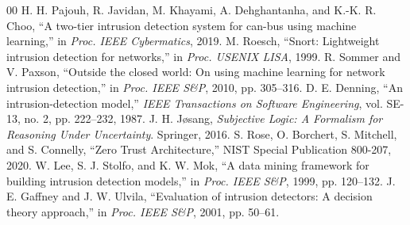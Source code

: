 \documentclass[journal,10pt,onecolumn]{IEEEtran}
\begin{document}
\begin{thebibliography}{00}
 H. H. Pajouh, R. Javidan, M. Khayami, A. Dehghantanha, and K.-K. R. Choo, ``A two-tier intrusion detection system for can-bus using machine learning,'' in \textit{Proc. IEEE Cybermatics}, 2019.
 M. Roesch, ``Snort: Lightweight intrusion detection for networks,'' in \textit{Proc. USENIX LISA}, 1999.
 R. Sommer and V. Paxson, ``Outside the closed world: On using machine learning for network intrusion detection,'' in \textit{Proc. IEEE S\&P}, 2010, pp. 305--316.
 D. E. Denning, ``An intrusion-detection model,'' \textit{IEEE Transactions on Software Engineering}, vol. SE-13, no. 2, pp. 222--232, 1987.
 J. H. J{\o}sang, \textit{Subjective Logic: A Formalism for Reasoning Under Uncertainty}. Springer, 2016.
 S. Rose, O. Borchert, S. Mitchell, and S. Connelly, ``Zero Trust Architecture,'' NIST Special Publication 800-207, 2020.
 W. Lee, S. J. Stolfo, and K. W. Mok, ``A data mining framework for building intrusion detection models,'' in \textit{Proc. IEEE S\&P}, 1999, pp. 120--132.
 J. E. Gaffney and J. W. Ulvila, ``Evaluation of intrusion detectors: A decision theory approach,'' in \textit{Proc. IEEE S\&P}, 2001, pp. 50--61.
\end{thebibliography}
\end{document}
